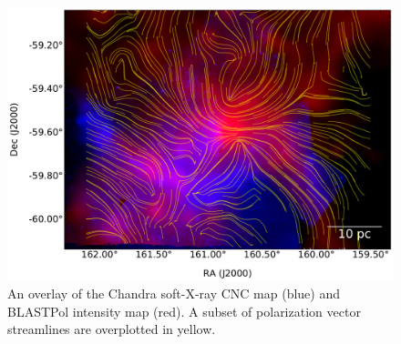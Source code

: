 \begin{figure}[!htbp]
\centering
\includegraphics[width=\textwidth]{figures/carina/chandra_soft_sl}
\caption[~An overlay of the Chandra soft-X-ray CNC map (blue) and BLASTPol intensity map (red).]{An overlay of the Chandra soft-X-ray CNC map (blue) \citep{townsley2011introduction} and BLASTPol intensity map (red). A subset of polarization vector streamlines are overplotted in yellow.}
\label{fig:chandra_overplot}
\end{figure}

